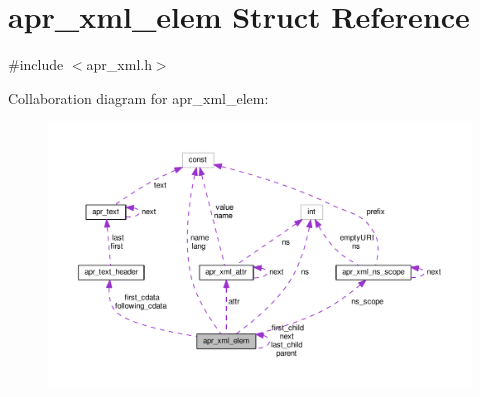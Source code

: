 \hypertarget{structapr__xml__elem}{}\section{apr\+\_\+xml\+\_\+elem Struct Reference}
\label{structapr__xml__elem}


{\ttfamily \#include $<$apr\+\_\+xml.\+h$>$}



Collaboration diagram for apr\+\_\+xml\+\_\+elem\+:
\nopagebreak
\begin{figure}[H]
\begin{center}
\leavevmode
\includegraphics[width=350pt]{structapr__xml__elem__coll__graph}
\end{center}
\end{figure}
